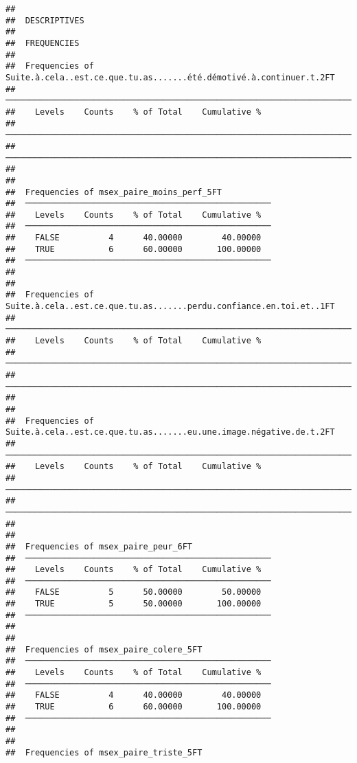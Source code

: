 \documentclass[
]{article}
\begin{document}
\begin{verbatim}
## 
##  DESCRIPTIVES
## 
##  FREQUENCIES
## 
##  Frequencies of Suite.à.cela..est.ce.que.tu.as.......été.démotivé.à.continuer.t.2FT 
##  ────────────────────────────────────────────────────────────────────────────────── 
##    Levels    Counts    % of Total    Cumulative %   
##  ────────────────────────────────────────────────────────────────────────────────── 
##  ────────────────────────────────────────────────────────────────────────────────── 
## 
## 
##  Frequencies of msex_paire_moins_perf_5FT           
##  ────────────────────────────────────────────────── 
##    Levels    Counts    % of Total    Cumulative %   
##  ────────────────────────────────────────────────── 
##    FALSE          4      40.00000        40.00000   
##    TRUE           6      60.00000       100.00000   
##  ────────────────────────────────────────────────── 
## 
## 
##  Frequencies of Suite.à.cela..est.ce.que.tu.as.......perdu.confiance.en.toi.et..1FT 
##  ────────────────────────────────────────────────────────────────────────────────── 
##    Levels    Counts    % of Total    Cumulative %   
##  ────────────────────────────────────────────────────────────────────────────────── 
##  ────────────────────────────────────────────────────────────────────────────────── 
## 
## 
##  Frequencies of Suite.à.cela..est.ce.que.tu.as.......eu.une.image.négative.de.t.2FT 
##  ────────────────────────────────────────────────────────────────────────────────── 
##    Levels    Counts    % of Total    Cumulative %   
##  ────────────────────────────────────────────────────────────────────────────────── 
##  ────────────────────────────────────────────────────────────────────────────────── 
## 
## 
##  Frequencies of msex_paire_peur_6FT                 
##  ────────────────────────────────────────────────── 
##    Levels    Counts    % of Total    Cumulative %   
##  ────────────────────────────────────────────────── 
##    FALSE          5      50.00000        50.00000   
##    TRUE           5      50.00000       100.00000   
##  ────────────────────────────────────────────────── 
## 
## 
##  Frequencies of msex_paire_colere_5FT               
##  ────────────────────────────────────────────────── 
##    Levels    Counts    % of Total    Cumulative %   
##  ────────────────────────────────────────────────── 
##    FALSE          4      40.00000        40.00000   
##    TRUE           6      60.00000       100.00000   
##  ────────────────────────────────────────────────── 
## 
## 
##  Frequencies of msex_paire_triste_5FT               

\end{verbatim}
\end{document}
